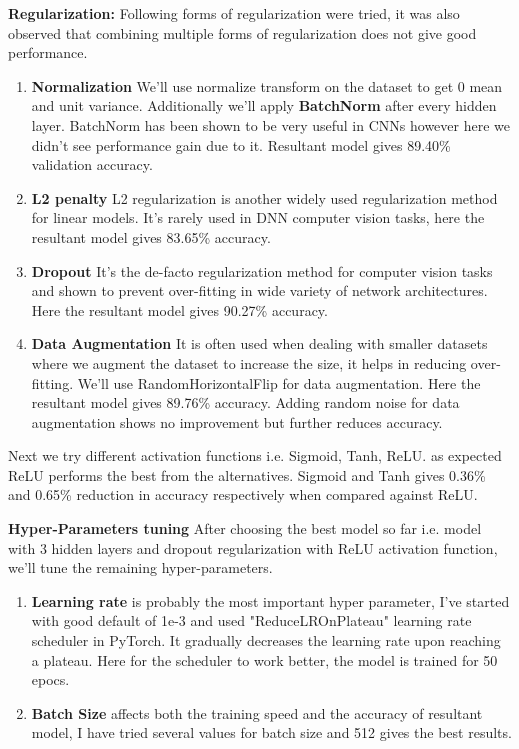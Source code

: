 \documentclass[10pt,a4paper]{article}
\begin{document}
\textbf{Regularization:} Following forms of regularization were tried, it was also observed that combining multiple forms of regularization does not give good performance.\\

\begin{enumerate}
\item \textbf{Normalization} We'll use normalize transform on the dataset to get 0 mean and unit variance. Additionally we'll apply \textbf{BatchNorm} after every hidden layer. BatchNorm has been shown to be very useful in CNNs however here we didn't see performance gain due to it. Resultant model gives 89.40\% validation accuracy. 

\item \textbf{L2 penalty} L2 regularization is another widely used regularization method for linear models. It's rarely used in DNN computer vision tasks, here the resultant model gives 83.65\% accuracy.

\item \textbf{Dropout} It's the de-facto regularization method for computer vision tasks and shown to prevent over-fitting in wide variety of network architectures. Here the resultant model gives 90.27\% accuracy.

\item \textbf{Data Augmentation} It is often used when dealing with smaller datasets where we augment the dataset to increase the size, it helps in reducing over-fitting. We'll use RandomHorizontalFlip for data augmentation. Here the resultant model gives 89.76\% accuracy. Adding random noise for data augmentation shows no improvement but further reduces accuracy.

\end{enumerate}

Next we try different activation functions i.e. Sigmoid, Tanh, ReLU. as expected ReLU performs the best from the alternatives. Sigmoid and Tanh gives 0.36\% and 0.65\% reduction in accuracy respectively when compared against ReLU.

\textbf{Hyper-Parameters tuning} After choosing the best model so far i.e. model with 3 hidden layers and dropout regularization with ReLU activation function, we'll tune the remaining hyper-parameters.
\begin{enumerate}
\item \textbf{Learning rate} is probably the most important hyper parameter, I've started with good default of 1e-3 and used "ReduceLROnPlateau" learning rate scheduler in PyTorch. It gradually decreases the learning rate upon reaching a plateau. Here for the scheduler to work better, the model is trained for 50 epocs.
\item \textbf{Batch Size} affects both the training speed and the accuracy of resultant model, I have tried several values for batch size and 512 gives the best results.

\end{enumerate}
\end{document}
